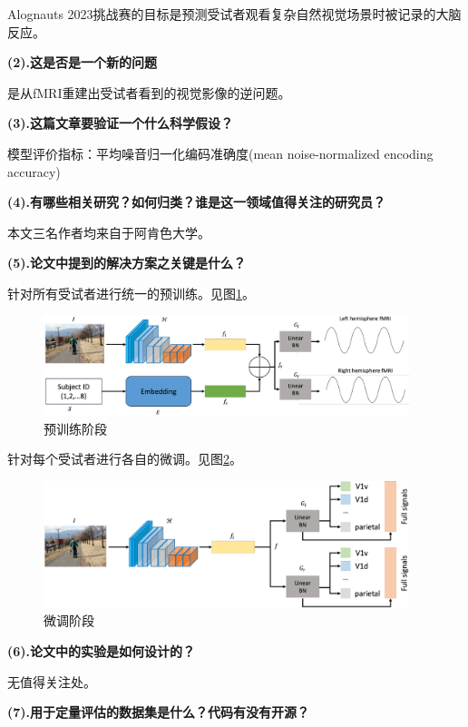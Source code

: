 \documentclass[12pt, a4paper, oneside]{ctexart}
\begin{document}
    Alognauts 2023挑战赛的目标是预测受试者观看复杂自然视觉场景时被记录的大脑反应。

    \noindent\textbf{(2).这是否是一个新的问题}

    是从fMRI重建出受试者看到的视觉影像的逆问题。

    \noindent\textbf{(3).这篇文章要验证一个什么科学假设？}

    模型评价指标：平均噪音归一化编码准确度(mean noise-normalized encoding accuracy)

    \noindent\textbf{(4).有哪些相关研究？如何归类？谁是这一领域值得关注的研究员？}

    本文三名作者均来自于阿肯色大学。

    \noindent\textbf{(5).论文中提到的解决方案之关键是什么？}

    针对所有受试者进行统一的预训练。见图\ref{pretrain stage}。
    \begin{figure}[htbp]
        \centering
        \includegraphics[width=0.95\textwidth]{pic/4.8_pretraining stage}
        \caption{预训练阶段}
        \label{pretrain stage}
    \end{figure}

    针对每个受试者进行各自的微调。见图\ref{fine-tuning stage}。
    \begin{figure}[htbp]
        \centering
        \includegraphics[width=0.95\textwidth]{pic/4.8_fine-tuning stage}
        \caption{微调阶段}
        \label{fine-tuning stage}
    \end{figure}

    \noindent\textbf{(6).论文中的实验是如何设计的？}

    无值得关注处。

    \noindent\textbf{(7).用于定量评估的数据集是什么？代码有没有开源？}
\end{document}
